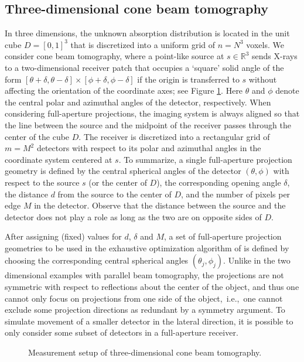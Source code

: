 \documentclass[final]{siamltex}
\newcommand{\R}{\mathbb{R}}
\begin{document}
\subsection{Three-dimensional cone beam tomography}
In three dimensions, the unknown absorption distribution is located in the unit cube $D = [0,1]^3$ that is discretized into a uniform grid of $n = N^3$ voxels. We consider cone beam tomography, where a point-like source at $s\in \R^3$ sends X-rays to a two-dimensional receiver patch that occupies a `square' solid angle of the form $[\theta + \delta, \theta - \delta] \times [\phi + \delta, \phi - \delta]$ if the origin is transferred to $s$ without affecting the orientation of the coordinate axes; see Figure \ref{fig:3dgeom}. Here $\theta$ and $\phi$ denote the central polar and azimuthal angles of the detector, respectively. When considering full-aperture projections, the imaging system is always aligned so that the line between the source and the midpoint of the receiver passes through the center of the cube $D$. The receiver is discretized into a rectangular grid of $m = M^2$ detectors with respect to its polar and azimuthal angles in the coordinate system centered at $s$. To summarize, a single full-aperture projection geometry is defined by the central spherical angles of the detector $(\theta, \phi)$ with respect to the source $s$ (or the center of $D$), the corresponding opening angle $\delta$, the distance $d$ from the source to the center of $D$, and the number of pixels per edge $M$ in the detector. Observe that the distance between the source and the detector does not play a role as long as the two are on opposite sides of $D$.

After assigning (fixed) values for $d$, $\delta$ and $M$, a set of full-aperture projection geometries to be used in the exhaustive optimization algorithm of \cite{Burger21} is defined by choosing the corresponding central spherical angles $(\theta_j, \phi_j)$. Unlike in the two dimensional examples with parallel beam tomography, the projections are not symmetric with respect to reflections about the center of the object, and thus one cannot only focus on projections from one side of the object,~i.e.,~one cannot exclude some projection directions as redundant by a symmetry argument. To simulate movement of a smaller detector in the lateral direction, it is possible to only consider some subset of detectors in a full-aperture receiver.

\begin{figure}
	\centering
	
	\caption{Measurement setup of three-dimensional cone beam tomography.}
	\label{fig:3dgeom}
\end{figure}
\end{document}
